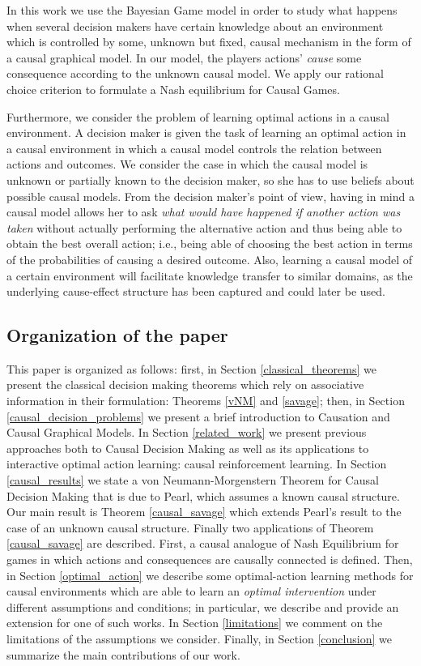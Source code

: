 \documentclass[review]{elsarticle}
\begin{document}
In this work we use the Bayesian Game model in order to study what happens when several decision makers have certain knowledge about an environment which is controlled by some, unknown but fixed, causal mechanism in the form of a causal graphical model. In our model, the players actions' \textit{cause} some consequence according to the unknown causal model. We apply our rational choice criterion to formulate a Nash equilibrium for Causal Games.

Furthermore, we consider the problem of learning optimal actions in a causal environment. A decision maker is given the task of learning an optimal action in a causal environment in which a causal model controls the relation between actions and outcomes. We consider the case in which the causal model is unknown or partially known to the decision maker, so she has to use beliefs about possible causal models. From the decision maker's point of view, having in mind a causal model allows her to ask \textit{what would have happened if another action was taken} without actually performing the alternative action and thus being able to obtain the best overall action; i.e., being able of choosing the best action in terms of the probabilities of causing a desired outcome. Also, learning a causal model of a certain environment will facilitate knowledge transfer to similar domains, as the underlying cause-effect structure has been captured and could later be used.

\subsection{Organization of the paper}
\label{organization}
This paper is organized as follows: first, in Section \ref{classical_theorems} we present the classical decision making theorems which rely on associative information in their formulation: Theorems \ref{vNM} and \ref{savage}; then, in Section \ref{causal_decision_problems} we present a brief introduction to Causation and Causal Graphical Models. In Section \ref{related_work} we present previous approaches both to Causal Decision Making as well as its applications to interactive optimal action learning: causal reinforcement learning. In Section \ref{causal_results} we state a von Neumann-Morgenstern Theorem for Causal Decision Making that is due to Pearl, which assumes a known causal structure. Our main result is Theorem \ref{causal_savage} which extends Pearl's result to the case of an unknown causal structure. Finally two applications of Theorem \ref{causal_savage} are described. First, a causal analogue of Nash Equilibrium for games in which actions and consequences are causally connected is defined. Then, in Section \ref{optimal_action} we describe some optimal-action learning methods for causal environments which are able to learn an \textit{optimal intervention} under different assumptions and conditions; in particular, we describe and provide an extension for one of such works. In Section \ref{limitations} we comment on the limitations of the assumptions we consider. Finally, in Section \ref{conclusion} we summarize the main contributions of our work.
\end{document}
